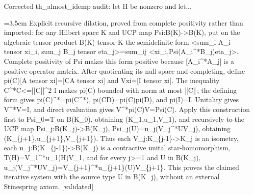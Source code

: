 \documentclass{article}
\newcommand{\step}[1]{\par\noindent\hangindent=3.5em\hangafter=1%
  \makebox[3.5em][l]{\textbf{#1.}}}
\newcommand{\steptag}[1]{\hfill{\small\textsf{[#1]}}}
\begin{document}
\begin{proofbox}{Corrected th\_almost\_idemp audit: let H be nonzero and let...}
\step{1.2.2.1} Explicit recursive dilation, proved from complete positivity rather than imported: for any Hilbert space K and UCP map Psi:B(K)->B(K), put on the algebraic tensor product B(K) tensor K the semidefinite form <sum\_i A\_i tensor xi\_i, sum\_j B\_j tensor eta\_j>=sum\_ij <xi\_i,Psi(A\_i\textasciicircum{}*B\_j)eta\_j>. Complete positivity of Psi makes this form positive because [A\_i\textasciicircum{}*A\_j] is a positive operator matrix. After quotienting its null space and completing, define pi(C)[A tensor xi]=[CA tensor xi] and Vxi=[I tensor xi]. The inequality C\textasciicircum{}*C<=||C||\textasciicircum{}2 I makes pi(C) bounded with norm at most ||C||; the defining form gives pi(C)\textasciicircum{}*=pi(C\textasciicircum{}*), pi(CD)=pi(C)pi(D), and pi(I)=I. Unitality gives V\textasciicircum{}*V=I, and direct evaluation gives V\textasciicircum{}*pi(C)V=Psi(C). Apply this construction first to Psi\_0=T on B(K\_0), obtaining (K\_1,u\_1,V\_1), and recursively to the UCP map Psi\_j:B(K\_j)->B(K\_j), Psi\_j(U)=u\_j(V\_j\textasciicircum{}*UV\_j), obtaining (K\_\{j+1\},u\_\{j+1\},V\_\{j+1\}). Thus each V\_j:K\_\{j-1\}->K\_j is an isometry, each u\_j:B(K\_\{j-1\})->B(K\_j) is a contractive unital star-homomorphism, T(H)=V\_1\textasciicircum{}*u\_1(H)V\_1, and for every j>=1 and U in B(K\_j), u\_j(V\_j\textasciicircum{}*UV\_j)=V\_\{j+1\}\textasciicircum{}*u\_\{j+1\}(U)V\_\{j+1\}. This proves the claimed iterative system with the source type U in B(K\_j), without an external Stinespring axiom. \steptag{validated} \\[4pt]

\end{proofbox}
\end{document}
